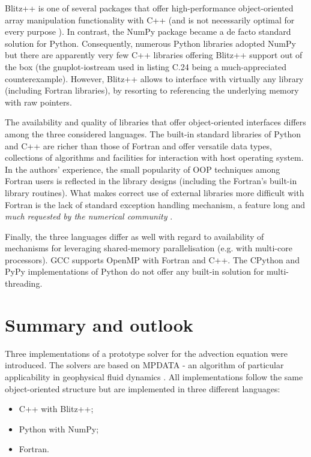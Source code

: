 \documentclass[final,5p,times,twocolumn]{elsarticle}
\begin{document}
  Blitz++ is one of several packages that offer high-performance object-oriented
    array manipulation functionality with C++ (and is not necessarily optimal for every
    purpose \citep{Iglberger_et_al_2012}).
  In contrast, the NumPy package became a de facto standard solution for Python.
  Consequently, numerous Python libraries adopted NumPy but
    there are apparently very few C++ libraries offering Blitz++ support out of the box
    (the gnuplot-iostream used in listing C.24 being a much-appreciated counterexample).
  However, Blitz++ allows to interface with virtually any library (including Fortran libraries), 
    by resorting to referencing the underlying memory with raw pointers.
 
  The availability and quality of libraries 
    that offer object-oriented interfaces
    differs among the three considered languages.
  The built-in standard libraries of Python and C++ are richer than
    those of Fortran and offer versatile data types, collections of
    algorithms and facilities for interaction with host operating system.
  In the authors' experience, the small popularity of OOP techniques among
    Fortran users is reflected in the library designs (including the Fortran's
    built-in library routines).
  What makes correct use of external libraries more difficult with Fortran
    is the lack of standard exception handling mechanism, a feature
    long and {\em much requested by the numerical community} \citep[][Foreword]{Press_et_al_1996}.

  Finally, the three languages differ as well with regard to availability of 
    mechanisms for leveraging shared-memory parallelisation (e.g. with multi-core processors).
  GCC supports OpenMP with Fortran and C++.
  The CPython and PyPy implementations of Python do not offer any
    built-in solution for multi-threading. 
  
  \section{Summary and outlook}

  Three implementations of a prototype solver 
    for the advection equation were introduced.
  The solvers are based on MPDATA - an algorithm of particular applicability
    in geophysical fluid dynamics \citep{Smolarkiewicz_2006}.
  All implementations follow the same object-oriented structure but are implemented
    in three different languages:
  \begin{itemize}
    \item{C++ with Blitz++;}
    \item{Python with NumPy;}
    \item{Fortran.}
  \end{itemize}
\end{document}

